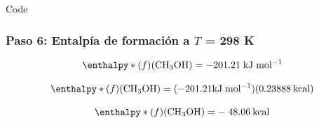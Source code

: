 \documentclass{beamer}
\begin{document}
\begin{frame}[fragile]{Code}
\frametitle{Paso 6: Entalpía de formación a $T$ = 298 K}

\begin{equation}
	\enthalpy*(f){}\mathrm{(CH_3OH) = -201.21\;kJ\;mol^{-1}}
\label{eq:4.19}
\end{equation}

\begin{equation}
	\enthalpy*(f){}\mathrm{(CH_3OH) = (-201.21 kJ\;mol^{-1})(0.23888 \:kcal)}
\label{eq:4.20}
\end{equation}

\begin{equation}
	\enthalpy*(f){}\mathrm{(CH_3OH) = -\;48.06 \:kcal}
\label{eq:4.21}
\end{equation}
\end{frame}
\end{document}
